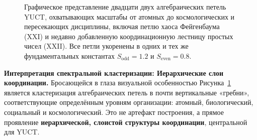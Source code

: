 \documentclass[12pt,a4paper]{article}
\begin{document}
\begin{figure}[htbp]
		\caption{Графическое представление двадцати двух алгебраических петель YUCT, охватывающих масштабы от атомных до космологических и пересекающих дисциплины, включая петлю хаоса Фейгенбаума (XXI) и недавно добавленную координационную лестницу простых чисел (XXII). Все петли укоренены в одних и тех же фундаментальных константах $S_{\mathrm{odd}} = 1.2$ и $S_{\mathrm{even}} = 0.8$.}
		\label{fig:twentyone-loops}
	\end{figure}
	
	\vspace{0.5cm}
	\noindent
	\textbf{Интерпретация спектральной кластеризации: Иерархические слои координации.}
	Бросающейся в глаза визуальной особенностью Рисунка~\ref{fig:twentyone-loops} является кластеризация алгебраических петель в почти вертикальные «гребни», соответствующие определённым уровням организации: атомный, биологический, социальный и космологический. Это не артефакт построения, а прямое проявление \textbf{иерархической, слоистой структуры координации}, центральной для YUCT.
	
\end{document}
